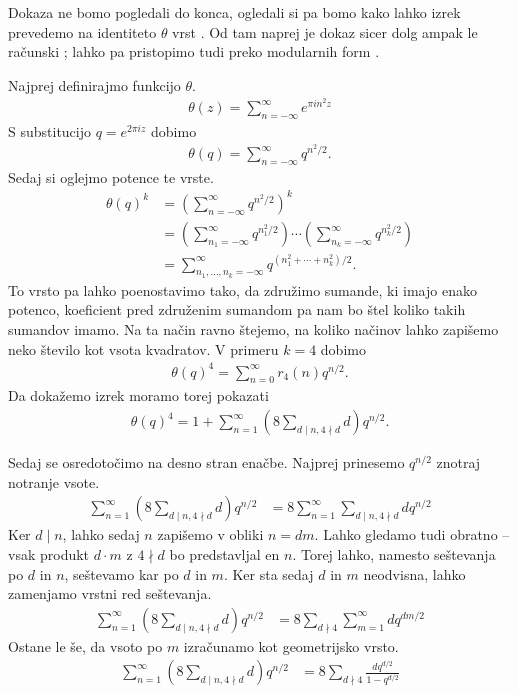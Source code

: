 \begin{dokaz}
    Dokaza ne bomo pogledali do konca, ogledali si pa bomo kako lahko izrek prevedemo na identiteto \(\theta\) vrst \cite{kato3}. Od tam naprej je dokaz sicer dolg ampak le računski \cite{Hirschhorn_1982}; lahko pa pristopimo tudi preko modularnih form \cite{kato3}.

    Najprej definirajmo funkcijo \(\theta\).
    \begin{align*}
        \theta(z) = \sum_{n=-\infty}^\infty e^{\pi i n^2 z}
    \end{align*}
    S substitucijo \(q = e^{2\pi i z}\) dobimo
    \begin{align*}
        \theta(q) = \sum_{n=-\infty}^\infty q^{n^2/2}.
    \end{align*}
    Sedaj si oglejmo potence te vrste.
    \begin{align*}
        \theta(q)^k & = \left(\sum_{n=-\infty}^\infty q^{n^2/2}\right)^k \\
                    & = \left(\sum_{n_1=-\infty}^\infty q^{n_1^2/2}\right) \cdots \left(\sum_{n_k=-\infty}^\infty q^{n_k^2/2}\right) \\
                    & = \sum_{n_1, \ldots, n_k = -\infty}^\infty q^{(n_1^2 + \cdots + n_k^2)/2}.
    \end{align*}
    To vrsto pa lahko poenostavimo tako, da združimo sumande, ki imajo enako potenco, koeficient pred združenim sumandom pa nam bo štel koliko takih sumandov imamo. Na ta način ravno štejemo, na koliko načinov lahko zapišemo neko število kot vsota kvadratov. V primeru \(k=4\) dobimo
    \begin{align*}
        \theta(q)^4 = \sum_{n=0}^\infty r_4(n) q^{n/2}.
    \end{align*}
    Da dokažemo izrek moramo torej pokazati
    \begin{align*}
        \theta(q)^4 = 1+\sum_{n=1}^\infty \left(8\sum_{d\mid n, 4\nmid d} d \right) q^{n/2}.
    \end{align*}

    Sedaj se osredotočimo na desno stran enačbe. Najprej prinesemo \(q^{n/2}\) znotraj notranje vsote.
    \begin{align*}
        \sum_{n=1}^\infty \left(8\sum_{d\mid n, 4\nmid d} d \right) q^{n/2} & =  8\sum_{n=1}^\infty \sum_{d\mid n, 4\nmid d} d  q^{n/2}
    \end{align*}
    Ker \(d \mid n\), lahko sedaj \(n\) zapišemo v obliki \(n = dm\). Lahko gledamo tudi obratno -- vsak produkt \(d\cdot m\) z \(4\nmid d\) bo predstavljal en \(n\). Torej lahko, namesto seštevanja po \(d\) in \(n\), seštevamo kar po \(d\) in \(m\). Ker sta sedaj \(d\) in \(m\) neodvisna, lahko zamenjamo vrstni red seštevanja.
    \begin{align*}
        \sum_{n=1}^\infty \left(8\sum_{d\mid n, 4\nmid d} d \right) q^{n/2} & =  8\sum_{d\nmid 4} \sum_{m = 1}^\infty d  q^{dm/2}
    \end{align*}
    Ostane le še, da vsoto po \(m\) izračunamo kot geometrijsko vrsto.
    \begin{align*}
        \sum_{n=1}^\infty \left(8\sum_{d\mid n, 4\nmid d} d \right) q^{n/2} & = 8\sum_{d\nmid 4} \frac{d q^{d/2}}{1-q^{d/2}}
    \end{align*}


\end{dokaz}
